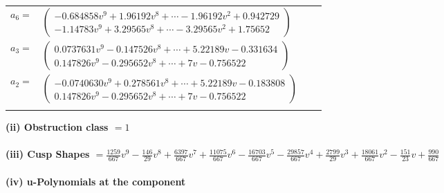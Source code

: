 \documentclass[1p]{elsarticle_modified}
\theoremstyle{definition}
\begin{document}
\begin{tabular}{m{7pt} m{180pt} m{7pt} m{180pt} }
\flushright $a_{6}=$&$\begin{pmatrix}-0.684858 v^{9}+1.96192 v^{8}+\cdots-1.96192 v^{2}+0.942729\\-1.14783 v^{9}+3.29565 v^{8}+\cdots-3.29565 v^{2}+1.75652\end{pmatrix}$ \\
\flushright $a_{3}=$&$\begin{pmatrix}0.0737631 v^{9}-0.147526 v^{8}+\cdots+5.22189 v-0.331634\\0.147826 v^{9}-0.295652 v^{8}+\cdots+7 v-0.756522\end{pmatrix}$ \\
\flushright $a_{2}=$&$\begin{pmatrix}-0.0740630 v^{9}+0.278561 v^{8}+\cdots+5.22189 v-0.183808\\0.147826 v^{9}-0.295652 v^{8}+\cdots+7 v-0.756522\end{pmatrix}$\\&\end{tabular}
\flushleft \textbf{(ii) Obstruction class $= 1$}\\~\\
\flushleft \textbf{(iii) Cusp Shapes $= \frac{1259}{667} v^9-\frac{146}{29} v^8+\frac{6397}{667} v^7+\frac{11075}{667} v^6-\frac{16703}{667} v^5-\frac{29857}{667} v^4+\frac{2799}{29} v^3+\frac{18061}{667} v^2-\frac{151}{23} v+\frac{990}{667}$}\\~\\
\newpage\renewcommand{\arraystretch}{1}
\flushleft \textbf{(iv) u-Polynomials at the component}\newline \\
\end{document}
